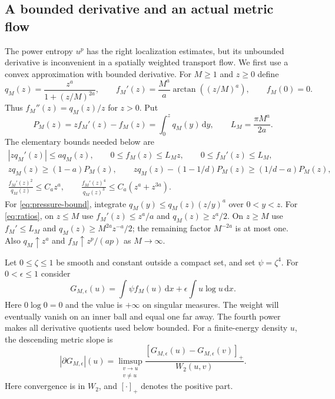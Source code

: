 \documentclass[11pt]{article}
\numberwithin{equation}{section}
\theoremstyle{definition}
\theoremstyle{remark}
\newcommand{\dd}{\,\mathrm d}
\begin{document}
\subsection{A bounded derivative and an actual metric flow}
The power entropy $u^p$ has the right localization estimates, but its
unbounded derivative is inconvenient in a spatially weighted transport
flow. We first use a convex approximation with bounded derivative.
For $M\ge1$ and $z\ge0$ define
\begin{equation}\label{eq:scalar}
 q_M(z)=\frac{z^a}{1+(z/M)^{2a}},\qquad
 f_M'(z)=\frac{M^a}{a}\arctan((z/M)^a),\qquad f_M(0)=0.
\end{equation}
Thus $f_M''(z)=q_M(z)/z$ for $z>0$. Put
\begin{equation}\label{eq:pressure}
 P_M(z)=zf_M'(z)-f_M(z)=\int_0^z q_M(y)\dd y,
 \qquad L_M=\frac{\pi M^a}{2a}.
\end{equation}
The elementary bounds needed below are
\begin{gather}
 |zq_M'(z)|\le a q_M(z),\qquad
 0\le f_M(z)\le L_M z,\qquad 0\le f_M'(z)\le L_M,
                                                   \label{eq:scalar-bounds}\\
 zq_M(z)\ge(1-a)P_M(z),\qquad
 zq_M(z)-(1-1/d)P_M(z)\ge(1/d-a)P_M(z),              \label{eq:pressure-bound}\\
 \frac{f_M'(z)^2}{q_M(z)}\le C_a z^a,\qquad
 \frac{f_M'(z)^4}{q_M(z)^3}\le C_a(z^a+z^{3a}).       \label{eq:ratios}
\end{gather}
For \eqref{eq:pressure-bound}, integrate
$q_M(y)\le q_M(z)(z/y)^a$ over $0<y<z$.
For \eqref{eq:ratios}, on $z\le M$ use
$f_M'(z)\le z^a/a$ and $q_M(z)\ge z^a/2$.
On $z\ge M$ use $f_M'\le L_M$ and
$q_M(z)\ge M^{2a}z^{-a}/2$; the remaining factor $M^{-2a}$ is at most one.
Also $q_M\uparrow z^a$ and $f_M\uparrow z^p/(ap)$ as $M\to\infty$.

Let $0\le\zeta\le1$ be smooth and constant outside a compact set, and set
$\psi=\zeta^4$. For $0<\epsilon\le1$ consider
\begin{equation}\label{eq:G}
 G_{M,\epsilon}(u)=\int\psi f_M(u)\dd x
                       +\epsilon\int u\log u\dd x.
\end{equation}
Here $0\log0=0$ and the value is $+\infty$ on singular measures.
The weight will eventually vanish on an inner ball and equal one far away.
The fourth power makes all derivative quotients used below bounded.
For a finite-energy density $u$, the descending metric slope is
\[
 |\partial G_{M,\epsilon}|(u)
 =\limsup_{\substack{v\to u\\v\ne u}}
    \frac{[G_{M,\epsilon}(u)-G_{M,\epsilon}(v)]_+}{W_2(u,v)}.
\]
Here convergence is in $W_2$, and $[\cdot]_+$ denotes the positive part.
\end{document}
